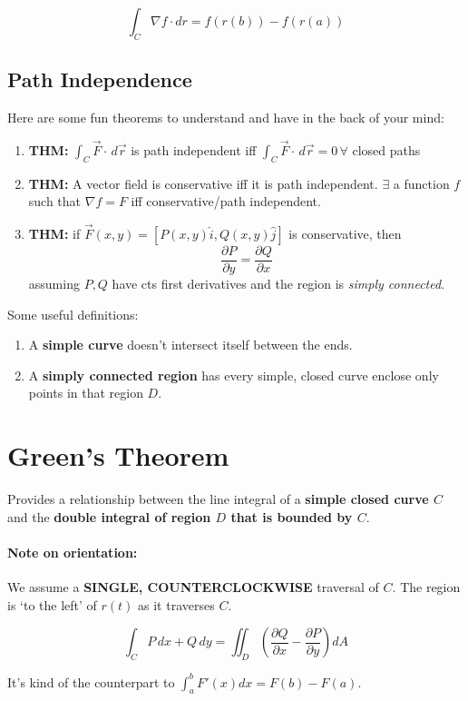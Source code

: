 \documentclass[a4paper,12pt]{report}
\begin{document}
$$\int_C \nabla f \cdot dr = f(r(b)) - f(r(a))$$

\subsection{Path Independence}
Here are some fun theorems to understand and have in the back of your mind: 
\begin{enumerate}
\item \textbf{THM: } $\int_C \vec{F}\cdot\,d\vec{r}$ is path independent iff 
$\int_C \vec{F}\cdot\,d\vec{r} = 0 \, \forall$ closed paths
\item \textbf{THM: } A vector field is conservative iff it is path independent. 
$\exists$ a function $f$ such that $\nabla f = F$ iff conservative/path independent.
\item \textbf{THM: } if $\vec{F}(x, y) = [P(x, y)\hat{i}, Q(x, y)\hat{j}]$ is conservative, 
then $$\frac{\partial P}{\partial y} = \frac{\partial Q}{\partial x}$$ assuming $P, Q$ have cts first derivatives and 
the region is \textit{simply connected}.
\end{enumerate}

Some useful definitions:
\begin{enumerate}
\item A \textbf{simple curve} doesn't intersect itself between the ends.
\item A \textbf{simply connected region} has every simple, closed curve enclose only points in that region $D$.
\end{enumerate}

\section{Green's Theorem}
Provides a relationship between the line integral of a \textbf{simple closed curve $C$} and the \textbf{double integral of 
region $D$ that is bounded by $C$}. 

\paragraph{Note on orientation: } We assume a \textbf{SINGLE, COUNTERCLOCKWISE} traversal of $C$. The region is `to the left' 
of $r(t)$ as it traverses $C$.

$$\int_C P\,dx+Q\,dy = \iint_D (\frac{\partial Q}{\partial x} - \frac{\partial P}{\partial y})dA$$

It's kind of the counterpart to $\int_a^b F'(x) dx = F(b)-F(a)$.
\end{document}
